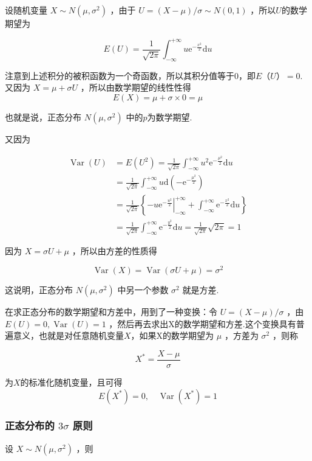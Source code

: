 设随机变量 $X \sim N\left(\mu, \sigma^{2}\right)$ ，由于 $U=(X-\mu) / \sigma \sim N(0,1)$ ，所以$ U $的数学期望为

\[
E(U)=\frac{1}{\sqrt{2 \pi}} \int_{-\infty}^{+\infty} u \mathrm{e}^{-\frac{x^{2}}{2}} \mathrm{d} u
\]

注意到上述积分的被积函数为一个奇函数，所以其积分值等于0，即$ E（U）=0 $.
又因为 $X=\mu+\sigma U$ ，所以由数学期望的线性性得
\[
E(X)=\mu+\sigma \times 0=\mu
\]

也就是说，正态分布 $N\left(\mu, \sigma^{2}\right)$ 中的$ p $为数学期望.

又因为

\[
\begin{array}{ll}
{\operatorname{Var}(U)} & {=E\left(U^{2}\right)=\frac{1}{\sqrt{2 \pi}} \int_{-\infty}^{+\infty} u^{2} \mathrm{e}^{-\frac{\mu^{2}}{2}} \mathrm{d} u} \\ 
{} & {=\frac{1}{\sqrt{2 \pi}} \int_{-\infty}^{+\infty} u \mathrm{d}\left(-\mathrm{e}^{-\frac{\mu^{2}}{2}}\right)} \\ 
{} & {=\frac{1}{\sqrt{2 \pi}}\left\{-u\left.\mathrm{e}^{-\frac{u^{2}}{2}}\right|_{-\infty} ^{+\infty}+\int_{-\infty}^{+\infty} \mathrm{e}^{-\frac{x^{2}}{2}} \mathrm{d} u\right\}} \\ 
{} & {=\frac{1}{\sqrt{2 \pi}} \int_{-\infty}^{+\infty} \mathrm{e}^{-\frac{y^{2}}{2}} \mathrm{d} u=\frac{1}{\sqrt{2 \pi}} \sqrt{2 \pi}=1}
\end{array}
\]

因为 $X=\sigma U+\mu$ ，所以由方差的性质得

\[
\operatorname{Var}(X)=\operatorname{Var}(\sigma U+\mu)=\sigma^{2}
\]

这说明，正态分布 $N\left(\mu, \sigma^{2}\right)$ 中另一个参数 $\sigma^{2}$ 就是方差.

在求正态分布的数学期望和方差中，用到了一种变换：令 $U=(X-\mu) / \sigma$ ，由 $E(U)=0, \operatorname{Var}(U)=1$ ，然后再去求出X的数学期望和方差.这个变换具有普遍意义，也就是对任意随机变量$ X $，如果X的数学期望为 $\mu$ ，方差为 $\sigma^{2}$ ，则称

\[
X^{*}=\frac{X-\mu}{\sigma}
\]

为$ X $的标准化随机变量，且可得
\[
E\left(X^{*}\right)=0, \quad \operatorname{Var}\left(X^{*}\right)=1
\]

\subsubsection{正态分布的 $ 3\sigma $ 原则}
设 $X \sim N\left(\mu, \sigma^{2}\right)$ ，则

